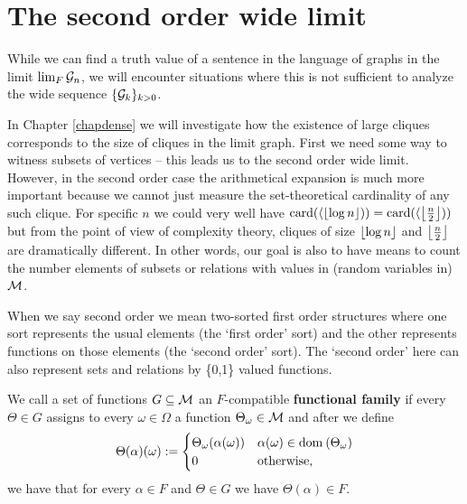 \section{The second order wide limit}

While we can find a truth value of a sentence in the language of graphs in the limit $\lim_{F}\mathcal{G}_n$, we will encounter situations where this is not sufficient to analyze the wide sequence $\{\mathcal{G}_k\}_{k>0}$. 

In Chapter \ref{chapdense} we will investigate how the existence of large cliques corresponds to the size of cliques in the limit graph. First we need some way to witness subsets of vertices -- this leads us to the second order wide limit. However, in the second order case the arithmetical expansion is much more important because we cannot just measure the set-theoretical cardinality of any such clique. For specific $n$ we could very well have $\text{card}(\langle \left \lfloor {\log{n}} \right \rfloor))=\text{card}(\langle \left \lfloor {\frac{n}{2}} \right \rfloor))$ but from the point of view of complexity theory, cliques of size $\left \lfloor {\log n} \right \rfloor$ and $\left \lfloor {\frac{n}{2}} \right \rfloor$ are dramatically different. In other words, our goal is also to have means to count the number elements of subsets or relations with values in (random variables in) $\mathcal{M}$.

When we say second order we mean two-sorted first order structures where one sort represents the usual elements (the `first order' sort) and the other represents functions on those elements (the `second order' sort). The `second order' here can also represent sets and relations by \{0,1\} valued functions.

\begin{defi}
We call a set of functions $G\subseteq \mathcal{M}$ an $F$-compatible \textbf{functional family} if every $\Theta\in G$ assigns to every $\omega\in\Omega$ a function $\Theta_\omega\in\mathcal{M}$ and after we define
\[\Theta(\alpha)(\omega):=
\begin{cases}\Theta_\omega(\alpha(\omega))&\alpha(\omega)\in\text{dom}\:(\Theta_\omega)\\0&\text{otherwise,}
\end{cases}\]
we have that for every $\alpha \in F$ and $\Theta \in G$ we have $\Theta(\alpha)\in F$.
\end{defi}

